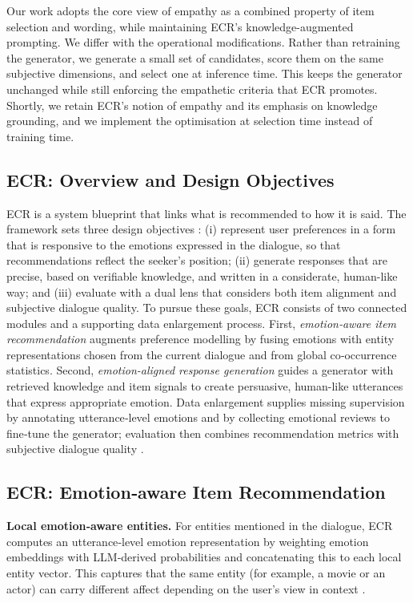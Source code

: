\documentclass[12pt]{article}
\begin{document}
  Our work adopts the core view of empathy as a combined property of item selection and wording, while maintaining ECR's knowledge-augmented prompting. We differ with the operational modifications. Rather than retraining the generator, we generate a small set of candidates, score them on the same subjective dimensions, and select one at inference time. This keeps the generator unchanged while still enforcing the empathetic criteria that ECR promotes. Shortly, we retain ECR's notion of empathy and its emphasis on knowledge grounding, and we implement the optimisation at selection time instead of training time.
  
  \subsection{ECR: Overview and Design Objectives}
  ECR is a system blueprint that links what is recommended to how it is said. The framework sets three design objectives \citep{zhang2024ecr}: (i) represent user preferences in a form that is responsive to the emotions expressed in the dialogue, so that recommendations reflect the seeker's position; (ii) generate responses that are precise, based on verifiable knowledge, and written in a considerate, human-like way; and (iii) evaluate with a dual lens that considers both item alignment and subjective dialogue quality. To pursue these goals, ECR consists of two connected modules and a supporting data enlargement process. First, \emph{emotion‑aware item recommendation} augments preference modelling by fusing emotions with entity representations chosen from the current dialogue and from global co‑occurrence statistics. Second, \emph{emotion-aligned response generation} guides a generator with retrieved knowledge and item signals to create persuasive, human-like utterances that express appropriate emotion. Data enlargement supplies missing supervision by annotating utterance‑level emotions and by collecting emotional reviews to fine‑tune the generator; evaluation then combines recommendation metrics with subjective dialogue quality \citep{zhang2024ecr}.
  
  \subsection{ECR: Emotion‑aware Item Recommendation}
  \textbf{Local emotion‑aware entities.} For entities mentioned in the dialogue, ECR computes an utterance‑level emotion representation by weighting emotion embeddings with LLM‑derived probabilities and concatenating this to each local entity vector. This captures that the same entity (for example, a movie or an actor) can carry different affect depending on the user's view in context \citep{zhang2024ecr}.
  
\end{document}
